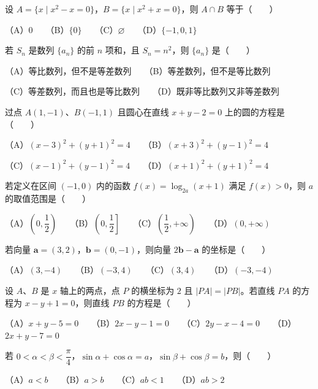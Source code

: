 \begin{question}
设 $A=\{x\mid x^2-x=0\}$，$B=\{x\mid x^2+x=0\}$，则 $A\cap B$ 等于\mbox{（　　）}

（A）$0$　　（B）$\{0\}$　　（C）$\varnothing$　　（D）$\{-1,0,1\}$

\end{question}
\begin{question}
若 $S_n$ 是数列 $\{a_n\}$ 的前 $n$ 项和，且 $S_n=n^2$，则 $\{a_n\}$ 是\mbox{（　　）}

（A）等比数列，但不是等差数列　　（B）等差数列，但不是等比数列

（C）等差数列，而且也是等比数列　　（D）既非等比数列又非等差数列

\end{question}
\begin{question}
过点 $A(1,-1)$、$B(-1,1)$ 且圆心在直线 $x+y-2=0$ 上的圆的方程是\mbox{（　　）}

（A）$(x-3)^2+(y+1)^2=4$　　（B）$(x+3)^2+(y-1)^2=4$

（C）$(x-1)^2+(y-1)^2=4$　　（D）$(x+1)^2+(y+1)^2=4$

\end{question}
\begin{question}
若定义在区间 $(-1,0)$ 内的函数 $f(x)=\log_{2a}(x+1)$ 满足 $f(x)>0$，则 $a$ 的取值范围是\mbox{（　　）}

（A）$\left(0,\dfrac12\right)$　　（B）$\left(0,\dfrac12\right]$　　（C）$\left(\dfrac12,+\infty\right)$　　（D）$(0,+\infty)$

\end{question}
\begin{question}
若向量 $\boldsymbol a=(3,2)$，$\boldsymbol b=(0,-1)$，则向量 $2\boldsymbol b-\boldsymbol a$ 的坐标是\mbox{（　　）}

（A）$(3,-4)$　　（B）$(-3,4)$　　（C）$(3,4)$　　（D）$(-3,-4)$

\end{question}
\begin{question}
设 $A$、$B$ 是 $x$ 轴上的两点，点 $P$ 的横坐标为 $2$ 且 $|PA|=|PB|$。若直线 $PA$ 的方程为 $x-y+1=0$，则直线 $PB$ 的方程是\mbox{（　　）}

（A）$x+y-5=0$　　（B）$2x-y-1=0$　　（C）$2y-x-4=0$　　（D）$2x+y-7=0$

\end{question}
\begin{question}
若 $0<\alpha<\beta<\dfrac\pi4$，$\sin\alpha+\cos\alpha=a$，$\sin\beta+\cos\beta=b$，则\mbox{（　　）}

（A）$a<b$　　（B）$a>b$　　（C）$ab<1$　　（D）$ab>2$

\end{question}
